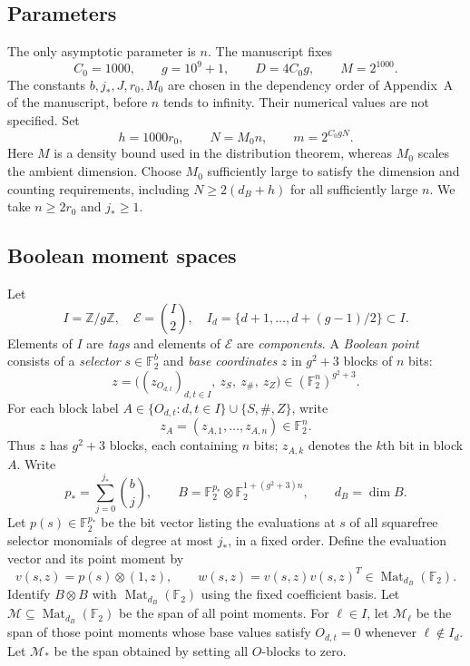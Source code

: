 \documentclass[11pt]{article}
\begin{document}
\subsection{Parameters}
The only asymptotic parameter is $n$. The manuscript fixes
\[
C_0=1000,\qquad g=10^9+1,\qquad D=4C_0g,\qquad M=2^{1000}.
\]
The constants $b,j_*,J,r_0,M_0$ are chosen in the dependency order of Appendix~A of the manuscript, before $n$ tends to infinity. Their numerical values are not specified. Set
\[
h=1000r_0,\qquad N=M_0n,\qquad m=2^{C_0gN}.
\]
Here $M$ is a density bound used in the distribution theorem, whereas $M_0$ scales the ambient dimension. Choose $M_0$ sufficiently large to satisfy the dimension and counting requirements, including $N\ge2(d_B+h)$ for all sufficiently large $n$. We take $n\ge2r_0$ and $j_*\ge1$.

\subsection{Boolean moment spaces}

Let
\[
I=\mathbb Z/g\mathbb Z,\quad \mathcal E=\binom I2,\quad
I_d=\{d+1,\ldots,d+(g-1)/2\}\subset I.
\]
Elements of $I$ are \emph{tags} and elements of $\mathcal E$ are \emph{components}. A \emph{Boolean point} consists of a \emph{selector} $s\in\mathbb F_2^b$ and \emph{base coordinates} $z$ in $g^2+3$ blocks of $n$ bits:
\[
z=\bigl((z_{O_{d,t}})_{d,t\in I},\ z_S,\ z_{\#},\ z_Z\bigr)
\in(\mathbb F_2^n)^{g^2+3}.
\]
For each block label $A\in\{O_{d,t}:d,t\in I\}\cup\{S,\#,Z\}$, write
\[
z_A=(z_{A,1},\ldots,z_{A,n})\in\mathbb F_2^n.
\]
Thus $z$ has $g^2+3$ blocks, each containing $n$ bits; $z_{A,k}$ denotes the $k$th bit in block $A$.
Write
\[
p_* =\sum_{j=0}^{j_*}\binom bj,\qquad
B=\mathbb F_2^{p_*}\otimes\mathbb F_2^{1+(g^2+3)n},\qquad d_B=\dim B.
\]
Let $p(s)\in\mathbb F_2^{p_*}$ be the bit vector listing the evaluations at $s$ of all squarefree selector monomials of degree at most $j_*$, in a fixed order. Define the evaluation vector and its point moment by
\[
v(s,z)=p(s)\otimes(1,z),\qquad w(s,z)=v(s,z)v(s,z)^T\in\operatorname{Mat}_{d_B}(\mathbb F_2).
\]
Identify $B\otimes B$ with $\operatorname{Mat}_{d_B}(\mathbb F_2)$ using the fixed coefficient basis. Let $\mathcal M\subseteq\operatorname{Mat}_{d_B}(\mathbb F_2)$ be the span of all point moments. For $\ell\in I$, let $\mathcal M_\ell$ be the span of those point moments whose base values satisfy $O_{d,t}=0$ whenever $\ell\notin I_d$. Let $\mathcal M_*$ be the span obtained by setting all $O$-blocks to zero.
\end{document}
